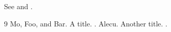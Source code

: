 \documentclass[10pt,twocolumn,letterpaper]{article}
\begin{document}
See \cite{key1} and \cite{key2}.
\begin{thebibliography}{9}
Mo, Foo, and Bar.
\newblock A title.
.
Alecu.
\newblock Another title.
.
\end{thebibliography}
\end{document}
